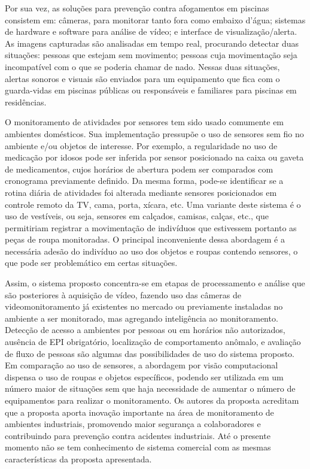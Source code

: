 Por sua vez, as soluções para prevenção contra afogamentos em piscinas consistem em: câmeras, para monitorar tanto fora como embaixo d’água; sistemas de hardware e software para análise de vídeo; e interface de visualização/alerta. As imagens capturadas são analisadas em tempo real, procurando detectar duas situações: pessoas que estejam sem movimento; pessoas cuja movimentação seja incompatível com o que se poderia chamar de nado. Nessas duas situações, alertas sonoros e visuais são enviados para um equipamento que fica com o guarda-vidas em piscinas públicas ou responsáveis e familiares para piscinas em residências.

O monitoramento de atividades por sensores tem sido usado comumente em ambientes domésticos. Sua implementação pressupõe o uso de sensores sem fio no ambiente e/ou objetos de interesse. Por exemplo, a regularidade no uso de medicação por idosos pode ser inferida por sensor posicionado na caixa ou gaveta de medicamentos, cujos horários de abertura podem ser comparados com cronograma previamente definido. Da mesma forma, pode-se identificar se a rotina diária de atividades foi alterada mediante sensores posicionados em controle remoto da TV, cama, porta, xícara, etc. Uma variante deste sistema é o uso de vestíveis, ou seja, sensores em calçados, camisas, calças, etc., que permitiriam registrar a movimentação de indivíduos que estivessem portanto as peças de roupa monitoradas. O principal inconveniente dessa abordagem é a necessária adesão do indivíduo ao uso dos objetos e roupas contendo sensores, o que pode ser problemático em certas situações.

Assim, o sistema proposto concentra-se em etapas de processamento e análise que são posteriores à aquisição de vídeo, fazendo uso das câmeras de videomonitoramento já existentes no mercado ou previamente instaladas no ambiente a ser monitorado, mas agregando inteligência ao monitoramento. Detecção de acesso a ambientes por pessoas ou em horários não autorizados, ausência de EPI obrigatório, localização de comportamento anômalo, e avaliação de fluxo de pessoas são algumas das possibilidades de uso do sistema proposto. Em comparação ao uso de sensores, a abordagem por visão computacional dispensa o uso de roupas e objetos específicos, podendo ser utilizada em um número maior de situações sem que haja necessidade de aumentar o número de equipamentos para realizar o monitoramento. Os autores da proposta acreditam que a  proposta aporta inovação importante na área de  monitoramento de ambientes industriais, promovendo maior segurança a colaboradores e contribuindo para prevenção contra acidentes industriais. Até o presente momento não se tem conhecimento de sistema comercial com as mesmas características da proposta apresentada.

